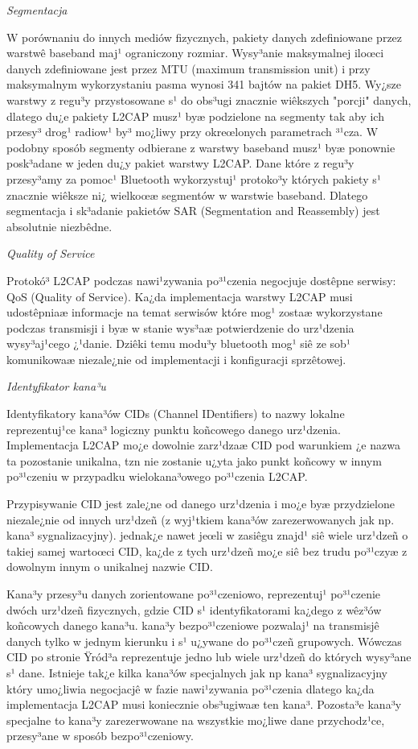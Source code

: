 \emph{Segmentacja}

W porównaniu do innych mediów fizycznych, pakiety danych
zdefiniowane przez warstwê baseband maj¹ ograniczony rozmiar.
Wysy³anie maksymalnej iloœci danych zdefiniowane jest przez MTU
(maximum transmission unit) i przy maksymalnym wykorzystaniu pasma
wynosi 341 bajtów na pakiet DH5. Wy¿sze warstwy z regu³y
przystosowane s¹ do obs³ugi znacznie wiêkszych "porcji" danych,
dlatego du¿e pakiety L2CAP musz¹ byæ podzielone na segmenty tak aby
ich przesy³ drog¹ radiow¹ by³ mo¿liwy przy okreœlonych parametrach
³¹cza. W podobny sposób segmenty odbierane z warstwy baseband musz¹
byæ ponownie posk³adane w jeden du¿y pakiet warstwy L2CAP. Dane
które z regu³y przesy³amy za pomoc¹ Bluetooth wykorzystuj¹ protoko³y
których pakiety s¹ znacznie wiêksze ni¿ wielkoœæ segmentów w
warstwie baseband. Dlatego segmentacja i sk³adanie pakietów SAR
(Segmentation and Reassembly) jest absolutnie niezbêdne.

\emph{Quality of Service}

Protokó³ L2CAP podczas nawi¹zywania po³¹czenia negocjuje dostêpne
serwisy: QoS (Quality of Service). Ka¿da implementacja warstwy L2CAP
musi udostêpniaæ informacje na temat serwisów które mog¹ zostaæ
wykorzystane podczas transmisji i byæ w stanie wys³aæ potwierdzenie
do urz¹dzenia wysy³aj¹cego ¿¹danie. Dziêki temu modu³y bluetooth
mog¹ siê ze sob¹ komunikowaæ niezale¿nie od implementacji i
konfiguracji sprzêtowej.


 \emph{Identyfikator kana³u}

Identyfikatory kana³ów CIDs (Channel IDentifiers) to nazwy lokalne
reprezentuj¹ce kana³ logiczny punktu koñcowego danego urz¹dzenia.
Implementacja L2CAP mo¿e dowolnie zarz¹dzaæ CID pod warunkiem ¿e
nazwa ta pozostanie unikalna, tzn nie zostanie u¿yta jako punkt
koñcowy w innym po³¹czeniu w przypadku wielokana³owego po³¹czenia
L2CAP.

Przypisywanie CID jest zale¿ne od danego urz¹dzenia i mo¿e byæ
przydzielone niezale¿nie od innych urz¹dzeñ (z wyj¹tkiem kana³ów
zarezerwowanych jak np. kana³ sygnalizacyjny). jednak¿e nawet jeœli
w zasiêgu znajd¹ siê wiele urz¹dzeñ o takiej samej wartoœci CID,
ka¿de z tych urz¹dzeñ mo¿e siê bez trudu po³¹czyæ z dowolnym innym o
unikalnej nazwie CID.

Kana³y przesy³u danych zorientowane po³¹czeniowo, reprezentuj¹
po³¹czenie dwóch urz¹dzeñ fizycznych, gdzie CID s¹ identyfikatorami
ka¿dego z wêz³ów koñcowych danego kana³u. kana³y bezpo³¹czeniowe
pozwalaj¹ na transmisjê danych tylko w jednym kierunku i s¹ u¿ywane
do po³¹czeñ grupowych. Wówczas CID po stronie Ÿród³a reprezentuje
jedno lub wiele urz¹dzeñ do których wysy³ane s¹ dane. Istnieje tak¿e
kilka kana³ów specjalnych jak np kana³ sygnalizacyjny który
umo¿liwia negocjacjê w fazie nawi¹zywania po³¹czenia dlatego ka¿da
implementacja L2CAP musi koniecznie obs³ugiwaæ ten kana³. Pozosta³e
kana³y specjalne to kana³y zarezerwowane na wszystkie mo¿liwe dane
przychodz¹ce, przesy³ane w sposób bezpo³¹czeniowy.

